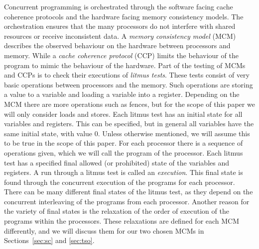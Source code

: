 \documentclass[runningheads]{llncs}
\begin{document}
Concurrent programming is orchestrated through the software facing cache coherence protocols and the hardware facing memory consistency models.
The orchestration ensures that the many processors do not interfere with shared resources or receive inconsistent data.
A \emph{memory consistency model} (MCM) describes the observed behaviour on the hardware between  processors and memory.
While a \emph{cache coherence protocol} (CCP) limits the behaviour of the program to mimic the behaviour of the hardware.
Part of the testing of MCMs and CCPs is to check their executions of \emph{litmus tests}.
These tests consist of very basic operations between processors and the memory.
Such operations are storing a value to a variable and loading a variable into a register.
Depending on the MCM there are more operations such as fences, but for the scope of this paper we will only consider loads and stores.
Each litmus test has an initial state for all variables and registers.
This can be specified, but in general all variables have the same initial state, with value 0.
Unless otherwise mentioned, we will assume this to be true in the scope of this paper.
For each processor there is a sequence of operations given, which we will call the program of the processor.
Each litmus test has a specified final allowed (or prohibited) state of the variables and registers.
A run through a litmus test is called an \emph{execution}.
This final state is found through the concurrent execution of the programs for each processor.
There can be many different final states of the litmus test, as they depend on the concurrent interleaving of the programs from each processor.
Another reason for the variety of final states is the relaxation of the order of execution of the programs within the processors.
These relaxations are defined for each MCM differently, and we will discuss them for our two chosen MCMs in Sections~\ref{sec:sc} and \ref{sec:tso}.
\end{document}
